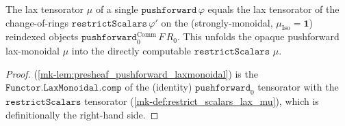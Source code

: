 \begin{lemma}\label{mk-lem:pushforward_mu_eq}
  \leanok

  The lax tensorator \(\mu\) of a single \(\mathtt{pushforward}\,\varphi\) equals the lax
  tensorator of the change-of-rings \(\mathtt{restrictScalars}\,\varphi'\) on the
  (strongly-monoidal, \(\mu_{\mathrm{Iso}} = \mathbf{1}\)) reindexed objects
  \(\mathtt{pushforward}_0^{\mathrm{Comm}}\,F\,R_0\). This unfolds the opaque pushforward
  lax-monoidal \(\mu\) into the directly computable \(\mathtt{restrictScalars}\) \(\mu\).
\end{lemma}
\begin{proof}
  \leanok
  (\ref{mk-lem:presheaf_pushforward_laxmonoidal}) is the \(\mathtt{Functor.LaxMonoidal.comp}\)
  of the (identity) \(\mathtt{pushforward}_0\) tensorator with the
  \(\mathtt{restrictScalars}\) tensorator (\ref{mk-def:restrict_scalars_lax_mu}), which is
  definitionally the right-hand side.
\end{proof}

